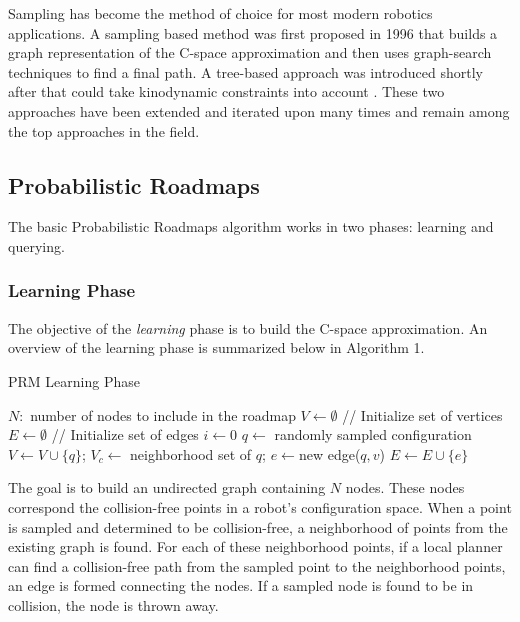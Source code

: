 \documentclass[10pt,conference]{ieeeconf}
\begin{document}
Sampling has become the method of choice for most modern robotics applications. A sampling based method was first proposed in 1996 \cite{PRM} that builds a graph representation of the C-space approximation and then uses graph-search techniques to find a final path. A tree-based approach was introduced shortly after that could take kinodynamic constraints into account \cite{RRT}. These two approaches have been extended and iterated upon many times and remain among the top approaches in the field.

\subsection{Probabilistic Roadmaps}

The basic Probabilistic Roadmaps algorithm \cite{PRM} works in two phases: learning and querying. 

\subsubsection{Learning Phase}

The objective of the \emph{learning} phase is to build the C-space approximation. An overview of the learning phase is summarized below in Algorithm 1.

\begin{algorithm}
\caption{PRM Learning Phase}
\begin{algorithmic}[1]
\State $N: $ number of nodes to include in the roadmap
\State $V \leftarrow \emptyset$ // Initialize set of vertices
\State $E \leftarrow \emptyset$ // Initialize set of edges
\State $i \leftarrow 0$
\State $q \leftarrow $ randomly sampled configuration
	\State $V \leftarrow V \cup \{q\}$;
	\State $V_c \leftarrow $ neighborhood set of $q$;
			\State $e \leftarrow $new edge($q,v$)
			\State $E \leftarrow E \cup \{e\}$
		\EndIf
	\EndFor
\EndIf
\EndWhile
\end{algorithmic}
\end{algorithm}

The goal is to build an undirected graph containing $N$ nodes. These nodes correspond the collision-free points in a robot's configuration space. When a point is sampled and determined to be collision-free, a neighborhood of points from the existing graph is found. For each of these neighborhood points, if a local planner can find a collision-free path from the sampled point to the neighborhood points, an edge is formed connecting the nodes. If a sampled node is found to be in collision, the node is thrown away.  
\end{document}
